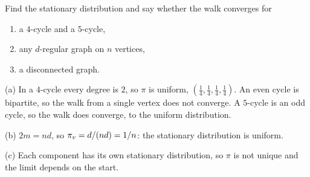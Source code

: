 \begin{exercisebox}
\begin{pproblem}\label{pp:walkshort}
    Find the stationary distribution and say whether the walk converges for
    \begin{enumerate}[label=(\alph*)]
        \item a $4$-cycle and a $5$-cycle,
        \item any $d$-regular graph on $n$ vertices,
        \item a disconnected graph.
    \end{enumerate}
\end{pproblem}
\tcblower
\begin{wsolution}
    (a) In a $4$-cycle every degree is $2$, so $\pi$ is uniform,
    $\left(\frac{1}{4}, \frac{1}{4}, \frac{1}{4}, \frac{1}{4}\right)$. An even cycle is bipartite, so
    the walk from a single vertex does not converge. A $5$-cycle is an odd cycle, so the walk does
    converge, to the uniform distribution.

    (b) $2m = nd$, so $\pi_v = d/(nd) = 1/n$: the stationary distribution is
    uniform.

    (c) Each component has its own stationary distribution, so $\pi$ is not unique and the limit
    depends on the start.
\end{wsolution}
\end{exercisebox}
